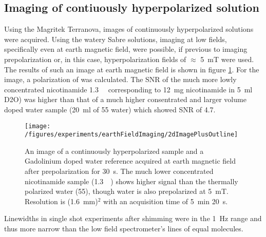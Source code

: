     \subsection{Imaging of contiuously hyperpolarized solution}
    Using the Magritek Terranova, images of continuously hyperpolarized solutions were acquired. Using the watery Sabre solutions, imaging at low fields, specifically even at earth magnetic field, were possible, if previous to imaging prepolarization or, in this case, hyperpolarization fields of $\approx$ \SI{5}{\milli\tesla} were used. The results of such an image at earth magnetic field is shown in figure \ref{fig:results:earthFieldImage}. For the image, a polarization of  was calculated. The SNR of the much more lowly concentrated nicotinamide \SI{1.3}{\milli\Molar} corresponding to \SI{12}{\milli\gram} nicotinamide in \SI{5}{\milli\litre} D2O) was higher than that of a much higher consentrated and larger volume doped water sample (\SI{20}{\milli\litre} of \SI{55}{\Molar} water) which showed SNR of 4.7.  \begin{figure}
            \label{fig:results:earthFieldImage}
            \texttt{[image: /figures/experiments/earthFieldImaging/2dImagePlusOutline]}
            \caption[Earth field Sabre image]{An image of a continuously hyperpolarized sample and a Gadolinium doped water reference acquired at earth magnetic field after prepolarization for \SI{30}{\second}. The much lower concentrated nicotinamide sample (\SI{1.3}{\milli\Molar}) shows higher signal than the thermally polarized water (\SI{55}{\Molar}), though water is also prepolarized at \SI{5}{\milli\tesla}. Resolution is (\SI{1.6}{\milli\meter})$^2$ with an acquisition time of \SI{5}{\minute} \SI{20}{\second}.}
        \end{figure}
        Linewidths in single shot experiments after shimming were in the \SI{1}{\hertz} range and thus more narrow than the low field spectrometer's lines of equal molecules.
